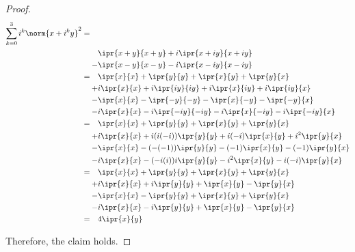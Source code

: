 \documentclass[11pt]{scrartcl}
\begin{document}
\begin{enumerate}[label=\alph*)]
\begin{proof}
    \begin{align*}
      \sum_{k=0}^3i^k\norm{x+i^ky}^2 =\ \ \ &                                                     \\
                                         & \ipr{x+y}{x+y}
                                   + i\ipr{x+iy}{x+iy}                                          \\
                                  -      & \ipr{x-y}{x-y}
                                     - i\ipr{x-iy}{x-iy}                                        \\
      =                           \ \ \  & \ipr{x}{x}+\ipr{y}{y}+\ipr{x}{y}+\ipr{y}{x}         \\
      +                                  & i\ipr{x}{x}+i\ipr{iy}{iy}+i\ipr{x}{iy}+i\ipr{iy}{x}     \\
      -                                  & \ipr{x}{x}-\ipr{-y}{-y}-\ipr{x}{-y}-\ipr{-y}{x}     \\
      -                                  & i\ipr{x}{x}-i\ipr{-iy}{-iy}-i\ipr{x}{-iy}-i\ipr{-iy}{x} \\
            =                           \ \ \  & \ipr{x}{x}+\ipr{y}{y}+\ipr{x}{y}+\ipr{y}{x}         \\
      +                                  & i\ipr{x}{x}+i(i(-i))\ipr{y}{y}+i(-i)\ipr{x}{y}+i^2\ipr{y}{x}     \\
      -                                  & \ipr{x}{x}-(-(-1))\ipr{y}{y}-(-1)\ipr{x}{y}-(-1)\ipr{y}{x}     \\
      -                                  & i\ipr{x}{x}-(-i(i))i\ipr{y}{y}-i^2\ipr{x}{y}-i(-i)\ipr{y}{x} \\
      =                           \ \ \  & \ipr{x}{x}+\ipr{y}{y}+\ipr{x}{y}+\ipr{y}{x}         \\
      +                                  & i\ipr{x}{x}+i\ipr{y}{y}+\ipr{x}{y}-\ipr{y}{x}     \\
      -                                  & \ipr{x}{x}-\ipr{y}{y}+\ipr{x}{y}+\ipr{y}{x}     \\
      -                                  & i\ipr{x}{x}-i\ipr{y}{y}+\ipr{x}{y}-\ipr{y}{x} \\
= \ \ \ & 4\ipr{x}{y}
    \end{align*}

    Therefore, the claim holds.
  \end{proof}
\end{enumerate}
\end{document}
